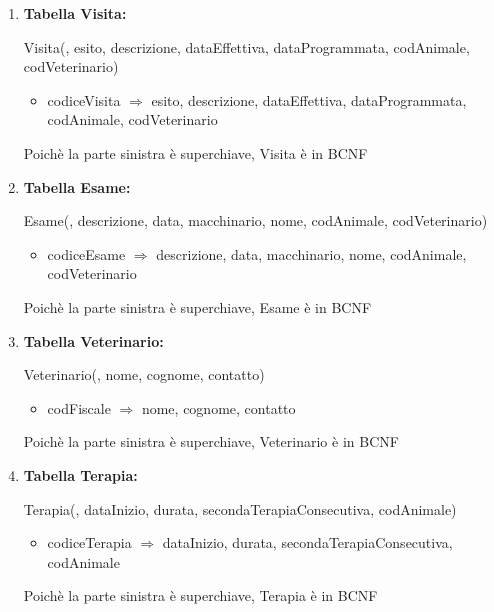 \documentclass[12pt,a4paper]{article}
\begin{document}
\begin{enumerate}
\item[] \textbf{Tabella Visita:}

Visita(\underline{}, esito, descrizione, dataEffettiva, dataProgrammata,  codAnimale,  codVeterinario)
\begin{itemize}
\vspace{-5pt}
\item codiceVisita $\Rightarrow$ esito, descrizione, dataEffettiva, dataProgrammata, codAnimale, codVeterinario
\vspace{-5pt}
\end{itemize}
Poichè la parte sinistra è superchiave, Visita è in BCNF
\vspace{10pt}



\item[] \textbf{Tabella Esame:}

Esame(\underline{},  descrizione, data, macchinario, nome,  codAnimale,  codVeterinario)
\begin{itemize}
\vspace{-5pt}
\item codiceEsame $\Rightarrow$ descrizione, data, macchinario, nome, codAnimale, codVeterinario
\vspace{-5pt}
\end{itemize}
Poichè la parte sinistra è superchiave, Esame è in BCNF
\vspace{10pt}



\item[] \textbf{Tabella Veterinario:}

Veterinario(\underline{}, nome, cognome, contatto)
\begin{itemize}
\vspace{-5pt}
\item codFiscale $\Rightarrow$ nome, cognome, contatto
\vspace{-5pt}
\end{itemize}
Poichè la parte sinistra è superchiave, Veterinario è in BCNF
\vspace{10pt}



\item[] \textbf{Tabella Terapia:}

Terapia(\underline{}, dataInizio, durata, secondaTerapiaConsecutiva,  codAnimale)
\begin{itemize}
\vspace{-5pt}
\item codiceTerapia $\Rightarrow$ dataInizio, durata, secondaTerapiaConsecutiva, codAnimale
\vspace{-5pt}
\end{itemize}
Poichè la parte sinistra è superchiave, Terapia è in BCNF
\vspace{10pt}




\end{enumerate}
\end{document}
